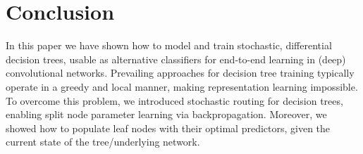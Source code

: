 \documentclass{article}
\begin{document}
\section{Conclusion}
In this paper we have shown how to model and train stochastic, differential decision trees, usable as alternative classifiers for end-to-end learning in (deep) convolutional networks. Prevailing approaches for decision tree training typically operate in a greedy and local manner, making representation learning impossible. To overcome this problem, we introduced stochastic routing for decision trees, enabling split node parameter learning via backpropagation. Moreover, we showed how to populate leaf nodes with their optimal predictors, given the current state of the tree/underlying network.


\printbibliography
\end{document}
